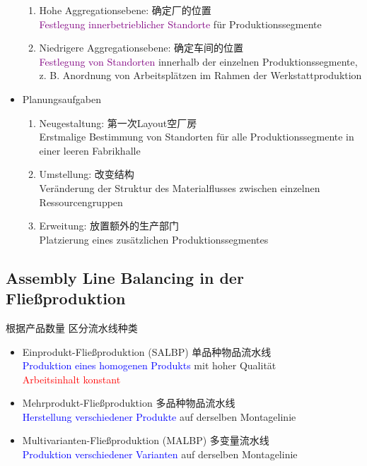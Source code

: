 \documentclass[12pt, letterpaper]{article}
\begin{document}
\begin{CJK*}{UTF8}{gbsn}
\begin{itemize}
\begin{enumerate}
\item Hohe Aggregationsebene: 确定厂的位置\\
\textcolor{purple}{Festlegung innerbetrieblicher Standorte} für Produktionssegmente
\item Niedrigere Aggregationsebene: 确定车间的位置\\
\textcolor{purple}{Festlegung von Standorten} innerhalb der einzelnen Produktionssegmente, z. B. Anordnung von Arbeitsplätzen im
Rahmen der Werkstattproduktion
\end{enumerate}


\item Planungsaufgaben

\begin{enumerate}
\item Neugestaltung: 第一次Layout空厂房\\
Erstmalige Bestimmung von Standorten für alle Produktionssegmente in einer leeren Fabrikhalle

\item Umstellung: 改变结构\\
Veränderung der Struktur des Materialflusses zwischen einzelnen Ressourcengruppen

\item Erweitung: 放置额外的生产部门\\
Platzierung eines zusätzlichen Produktionssegmentes
\end{enumerate}

\end{itemize}

\newpage
\subsection{Assembly Line Balancing in der Fließproduktion}
根据产品数量 区分流水线种类
\begin{itemize}
\item Einprodukt-Fließproduktion (SALBP) 单品种物品流水线\\[1mm]
\textcolor{blue}{Produktion eines homogenen Produkts} mit hoher Qualität\\[1mm]
\textcolor{red}{Arbeitsinhalt konstant}

\item Mehrprodukt-Fließproduktion 多品种物品流水线\\[1mm]
\textcolor{blue}{Herstellung verschiedener Produkte} auf derselben Montagelinie

\item Multivarianten-Fließproduktion (MALBP) 多变量流水线\\[1mm]
\textcolor{blue}{Produktion verschiedener Varianten} auf derselben Montagelinie\\


\end{itemize}
\end{CJK*}
\end{document}
